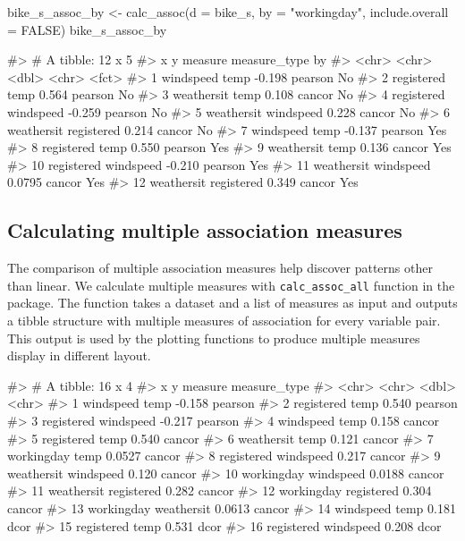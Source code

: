 \begin{Schunk}
\begin{Sinput}
bike_s_assoc_by <- calc_assoc(d = bike_s,
                            by = "workingday",
                            include.overall = FALSE)
bike_s_assoc_by
\end{Sinput}
\begin{Soutput}
#> # A tibble: 12 x 5
#>    x          y          measure measure_type by   
#>    <chr>      <chr>        <dbl> <chr>        <fct>
#>  1 windspeed  temp       -0.198  pearson      No   
#>  2 registered temp        0.564  pearson      No   
#>  3 weathersit temp        0.108  cancor       No   
#>  4 registered windspeed  -0.259  pearson      No   
#>  5 weathersit windspeed   0.228  cancor       No   
#>  6 weathersit registered  0.214  cancor       No   
#>  7 windspeed  temp       -0.137  pearson      Yes  
#>  8 registered temp        0.550  pearson      Yes  
#>  9 weathersit temp        0.136  cancor       Yes  
#> 10 registered windspeed  -0.210  pearson      Yes  
#> 11 weathersit windspeed   0.0795 cancor       Yes  
#> 12 weathersit registered  0.349  cancor       Yes
\end{Soutput}
\end{Schunk}

\hypertarget{calculating-multiple-association-measures}{%
\subsection{Calculating multiple association
measures}\label{calculating-multiple-association-measures}}

The comparison of multiple association measures help discover patterns
other than linear. We calculate multiple measures with
\texttt{calc\_assoc\_all} function in the package. The function takes a
dataset and a list of measures as input and outputs a tibble structure
with multiple measures of association for every variable pair. This
output is used by the plotting functions to produce multiple measures
display in different layout.

\begin{Schunk}
\begin{Soutput}
#> # A tibble: 16 x 4
#>    x          y          measure measure_type
#>    <chr>      <chr>        <dbl> <chr>       
#>  1 windspeed  temp       -0.158  pearson     
#>  2 registered temp        0.540  pearson     
#>  3 registered windspeed  -0.217  pearson     
#>  4 windspeed  temp        0.158  cancor      
#>  5 registered temp        0.540  cancor      
#>  6 weathersit temp        0.121  cancor      
#>  7 workingday temp        0.0527 cancor      
#>  8 registered windspeed   0.217  cancor      
#>  9 weathersit windspeed   0.120  cancor      
#> 10 workingday windspeed   0.0188 cancor      
#> 11 weathersit registered  0.282  cancor      
#> 12 workingday registered  0.304  cancor      
#> 13 workingday weathersit  0.0613 cancor      
#> 14 windspeed  temp        0.181  dcor        
#> 15 registered temp        0.531  dcor        
#> 16 registered windspeed   0.208  dcor
\end{Soutput}
\end{Schunk}

